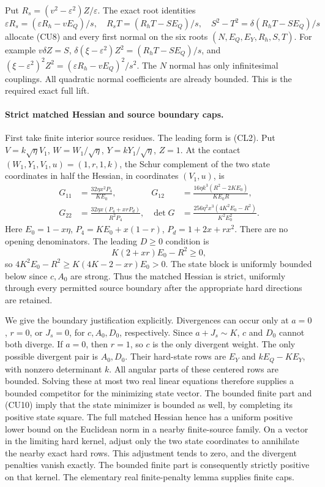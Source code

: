 Put $R_s=(v^2-\varepsilon^2)Z/\varepsilon$. The exact root identities
\[
 \varepsilon R_s=(\varepsilon R_h-vE_Q)/s,\quad
 R_sT=(R_hT-SE_Q)/s,\quad
 S^2-T^2=\delta(R_hT-SE_Q)/s                       \tag{CU9}
\]
allocate (CU8) and every first normal on the six roots
$(N,E_Q,E_Y,R_h,S,T)$. For example $v\delta Z=S$,
$\delta(\xi-\varepsilon^2)Z^2=(R_hT-SE_Q)/s$, and
$(\xi-\varepsilon^2)^2Z^2=(\varepsilon R_h-vE_Q)^2/s^2$.
The $N$ normal has only infinitesimal couplings. All quadratic normal
coefficients are already bounded. This is the required exact full lift.

\paragraph{Strict matched Hessian and source boundary caps.}
First take finite interior source residues. The leading form is
(CL2). Put $V=k\sqrt\eta V_1$, $W=W_1/\sqrt\eta$,
$Y=kY_1/\sqrt\eta$, $Z=1$. At the contact
$(W_1,Y_1,V_1,u)=(1,r,1,k)$, the Schur complement of the two state
coordinates in half the Hessian, in coordinates $(V_1,u)$, is
\[
\begin{aligned}
 G_{11}&=\frac{32\eta x^2P_4}{KE_0},&
 G_{12}&=\frac{16\eta k^3(R^2-2KE_0)}{KE_0R},\\
 G_{22}&=\frac{32\eta x(P_4+xrP_d)}{R^2P_4},&
 \det G&=\frac{256\eta^2x^3(4K^2E_0-R^2)}{K^2E_0^2}.
\end{aligned}                                                     \tag{CU10}
\]
Here $E_0=1-x\eta$, $P_4=KE_0+x(1-r)$, $P_d=1+2x+rx^2$.
There are no opening denominators. The leading $D\ge0$ condition is
\[
 K(2+xr)E_0-R^2\ge0,
\]
so $4K^2E_0-R^2\ge K(4K-2-xr)E_0>0$.
The state block is uniformly bounded below since $c,A_0$ are strong.
Thus the matched Hessian is strict, uniformly through every permitted
source boundary after the appropriate hard directions are retained.

We give the boundary justification explicitly. Divergences can occur
only at $a=0$, $r=0$, or $J_s=0$, for $c,A_0,D_0$, respectively.
Since $a+J_s\sim K$, $c$ and $D_0$ cannot both diverge. If $a=0$,
then $r=1$, so $c$ is the only divergent weight. The only possible
divergent pair is $A_0,D_0$. Their hard-state rows are $E_Y$ and
$kE_Q-KE_Y$, with nonzero determinant $k$. All angular parts of
these centered rows are bounded. Solving these at most two real
linear equations therefore supplies a bounded competitor for the
minimizing state vector. The bounded finite part and (CU10) imply
that the state minimizer is bounded as well, by completing its
positive state square. The full matched Hessian hence has a uniform
positive lower bound on the Euclidean norm in a nearby finite-source
family. On a vector in the limiting hard kernel, adjust only the two
state coordinates to annihilate the nearby exact hard rows. This
adjustment tends to zero, and the divergent penalties vanish exactly.
The bounded finite part is consequently strictly positive on that
kernel. The elementary real finite-penalty lemma supplies finite caps.

